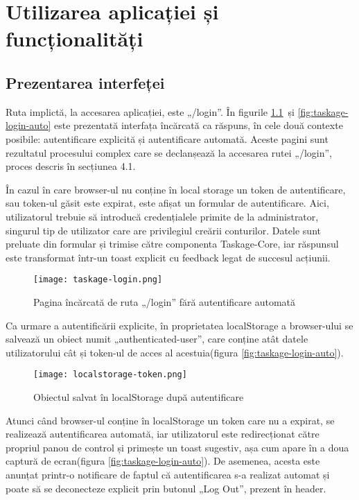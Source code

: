\chapter{Utilizarea aplicației și funcționalități}

\section{Prezentarea interfeței}

Ruta implictă, la accesarea aplicației, este „/login”. În figurile \ref{fig:taskage-login}\ și \ref{fig:taskage-login-auto} este prezentată interfața încărcată ca răspuns, în cele două contexte posibile: autentificare explicită și autentificare automată. Aceste pagini sunt rezultatul procesului complex care se declanșează la accesarea rutei „/login”, proces descris în secțiunea 4.1.

În cazul în care browser-ul nu conține în local storage un token de autentificare, sau token-ul găsit este expirat, este afișat un formular de autentificare. Aici, utilizatorul trebuie să introducă credențialele primite de la administrator, singurul tip de utilizator care are privilegiul creării conturilor. Datele sunt preluate din formular și trimise către componenta Taskage-Core, iar răspunsul este transformat într-un toast explicit cu feedback legat de succesul acțiunii. 

 \begin{figure}[H]
	\centering
 	 \texttt{[image: taskage-login.png]}
	\caption{Pagina încărcată de ruta „/login” fără autentificare automată}
	\label{fig:taskage-login}
 \end{figure}

Ca urmare a autentificării explicite, în proprietatea localStorage a browser-ului se salvează un obiect numit „authenticated-user”, care conține atât datele utilizatorului cât și token-ul de acces al acestuia(figura \ref{fig:taskage-login-auto}).

 \begin{figure}[H]
	\centering
 	\texttt{[image: localstorage-token.png]}
	\caption{Obiectul salvat în localStorage după autentificare}
	\label{fig:token}
 \end{figure}

Atunci când browser-ul conține în localStorage un token care nu a expirat, se realizează autentificarea automată, iar utilizatorul este redirecționat către propriul panou de control și primește un toast sugestiv, așa cum apare în a doua captură de ecran(figura \ref{fig:taskage-login-auto}). De asemenea, acesta este anunțat printr-o notificare de faptul că autentificarea s-a realizat automat și poate să se deconecteze explicit prin butonul „Log Out”, prezent în header.

